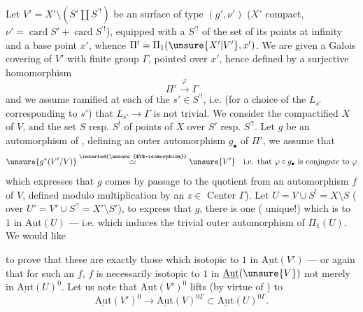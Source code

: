 Let $V'=X'\setminus(S'\amalg S^{\prime!})$ be an
  surface of type $(g',\nu')$
($X'$ compact, $\nu'=\operatorname{card} S'+\operatorname{card} S^{\prime!}$),
equipped with a  $S^{\prime!}$ of the set of its points at infinity
and a base point $x'$, whence $\Pi'=\Pi_1(\unsure{X'|V'},x')$.
We are given a Galois covering  of $V'$ with
finite group $\Gamma$, pointed over $x'$, hence defined by a surjective homomorphism
\[
\Pi'\xrightarrow{\varphi}\Gamma
\]
and we assume  ramified at each of the $s'\in S^{\prime!}$,
i.e. (for a choice of the   $L_{s'}$
corresponding to $s'$) that $L_{s'}\to\Gamma$ is not trivial.
We consider the compactified   $X$ of $V$,
and the set $S$ resp. $S^!$ of points of $X$ over $S'$ resp. $S^{\prime!}$.
Let $g$ be an automorphism of , defining an outer automorphism
$g_\bullet$ of $\Pi'$, we assume that
\[
\unsure{g^*(V'/V)}\overset{\text{\inserted{\unsure{$V$-isomorphism}}}}{\simeq}\unsure{V'}
\quad\text{i.e. that }\varphi\circ g_\bullet\text{ is conjugate to }\varphi
\]
\unsure{(|\{}which expresses that $g$ comes by passage to the quotient from an automorphism $f$ of $V$,
defined modulo multiplication by an 
$z\in$ Center $\Gamma$).
Let $U=V\cup S^!=X\setminus S$ ( over
$U'=V'\cup S^{\prime!}=X'\setminus S'$),
  to express that
 
$g$, there is one ( unique!) which is 
 to $1$ in $\underline{\mathrm{Aut}}(U)$ --- i.e. which induces
the trivial outer automorphism of $\Pi_1(U)$. We would like


to prove that these are exactly those which  
isotopic to $1$ in $\underline{\mathrm{Aut}}(V')$ --- or again that for such an $f$,
$f$ is necessarily isotopic to $1$ in $\underline{\mathrm{Aut}}(\unsure{V})$
 not merely in $\underline{\mathrm{Aut}}(U)^0$.
Let us note  that
$\underline{\mathrm{Aut}}(V')^0$ lifts (by virtue of ) to
\[
\underline{\mathrm{Aut}}(V')^0\longrightarrow
\underline{\mathrm{Aut}}(V)^{0\Gamma}\subset
\underline{\mathrm{Aut}}(U)^{0\Gamma}.
\]

